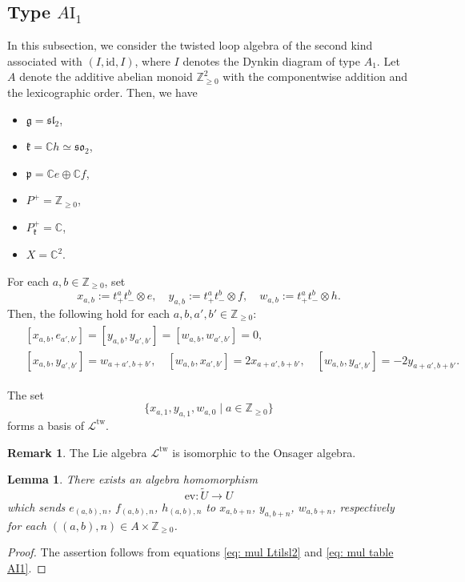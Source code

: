 \documentclass[12pt,a4paper]{amsart}
\newtheorem{lem}[thm]{Lemma}
\theoremstyle{definition}
\newtheorem{rem}[thm]{Remark}
\numberwithin{equation}{subsection}
\begin{document}
\subsection{Type $A\mathrm{I}_1$}
In this subsection, we consider the twisted loop algebra of the second kind associated with $(I,\mathrm{id},I)$, where
$I$ denotes the Dynkin diagram of type $A_1$.
Let $A$ denote the additive abelian monoid $\mathbb{Z}_{\geq 0}^2$ with the componentwise addition and the lexicographic order.
Then, we have
\begin{itemize}
  \item $\mathfrak{g} = \mathfrak{sl}_2$,
  \item $\mathfrak{k} = \mathbb{C} h \simeq \mathfrak{so}_2$,
  \item $\mathfrak{p} = \mathbb{C} e \oplus \mathbb{C} f$,
  \item $P^+ = \mathbb{Z}_{\geq 0}$,
  \item $P_\mathfrak{k}^+ = \mathbb{C}$,
  \item $X = \mathbb{C}^2$.
\end{itemize}

For each $a,b \in \mathbb{Z}_{\geq 0}$, set
\[
  x_{a,b} := t_+^a t_-^b \otimes e, \quad y_{a,b} := t_+^a t_-^b \otimes f, \quad w_{a,b} := t_+^a t_-^b \otimes h.
\]
Then, the following hold for each $a,b,a',b' \in \mathbb{Z}_{\geq 0}$:
\begin{align}\label{eq: mul table AI1}
  \begin{split}
    &[x_{a,b},e_{a',b'}] = [y_{a,b},y_{a',b'}] = [w_{a,b},w_{a',b'}] = 0,\\
    &[x_{a,b},y_{a',b'}] = w_{a+a',b+b'},
    \quad
    [w_{a,b},x_{a',b'}] = 2x_{a+a',b+b'},
    \quad
    [w_{a,b},y_{a',b'}] = -2y_{a+a',b+b'}.
  \end{split}
\end{align}

The set
\[
  \{ x_{a,1}, y_{a,1}, w_{a,0} \mid a \in \mathbb{Z}_{\geq 0} \}
\]
forms a basis of $\mathcal{L}^\mathrm{tw}$.

\begin{rem}
  The Lie algebra $\mathcal{L}^{\mathrm{tw}}$ is isomorphic to the Onsager algebra.
\end{rem}

\begin{lem}
  There exists an algebra homomorphism
  \[
    \mathrm{ev} : \tilde{U} \to U
  \]
  which sends $e_{(a,b),n}$, $f_{(a,b),n}$, $h_{(a,b),n}$ to $x_{a,b+n}$, $y_{a,b+n}$, $w_{a,b+n}$, respectively for each $((a,b),n) \in A \times \mathbb{Z}_{\geq 0}$.
\end{lem}
\begin{proof}
  The assertion follows from equations \eqref{eq: mul Ltilsl2} and \eqref{eq: mul table AI1}.
\end{proof}
\end{document}
